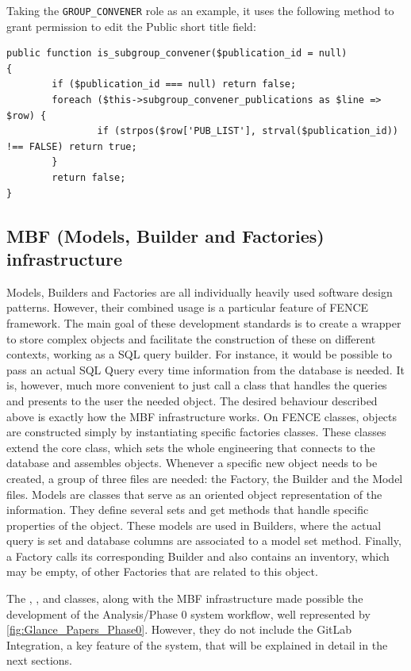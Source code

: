 Taking the \texttt{GROUP\_CONVENER} role as an example, it uses the following method to grant permission to edit the Public short title field:

\begin{lstlisting}
public function is_subgroup_convener($publication_id = null)
{
        if ($publication_id === null) return false;
        foreach ($this->subgroup_convener_publications as $line => $row) {
                if (strpos($row['PUB_LIST'], strval($publication_id)) !== FALSE) return true;
        }
        return false;
}
\end{lstlisting}


\subsection{MBF (Models, Builder and Factories) infrastructure}%
\label{sec:MBF_Models_Builder_and_Factories_infrastructure}

Models, Builders and Factories are all individually heavily used software design patterns.
However, their combined usage is a particular feature of FENCE framework.
The main goal of these development standards is to create a wrapper to store complex objects and facilitate the construction of these on different contexts, working as a SQL query builder.
For instance, it would be possible to pass an actual SQL Query every time information from the database is needed.
It is, however, much more convenient to just call a class that handles the queries and presents to the user the needed object.
The desired behaviour described above is exactly how the MBF infrastructure works.
On FENCE classes, objects are constructed simply by instantiating specific factories classes.
These classes extend the core  class, which sets the whole engineering that connects to the database and assembles objects.
Whenever a specific new object needs to be created, a group of three files are needed: the Factory, the Builder and the Model files.
Models are classes that serve as an oriented object representation of the information. They define several sets and get methods that handle specific properties of the object. These models are used in Builders, where the actual query is set and database columns are associated to a model set method. Finally, a Factory calls its corresponding Builder and also contains an inventory, which may be empty, of other Factories that are related to this object.

The , ,  and  classes, along with the MBF infrastructure made possible the development of the Analysis/Phase 0 system workflow, well represented by \cref{fig:Glance_Papers_Phase0}.
However, they do not include the GitLab Integration, a key feature of the system, that will be explained in detail in the next sections.

